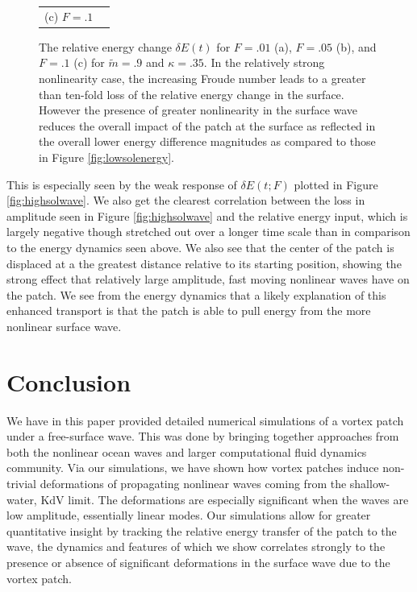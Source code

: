 \documentclass[a4paper,11pt]{article}
\begin{document}
\begin{figure}
\begin{tabular}{cc}
 (c) $F=.1$
\end{tabular}
\caption{The relative energy change $\delta E(t)$ for $F=.01$ (a), $F=.05$ (b), and $F=.1$ (c) for $\tilde{m}=.9$ and $\kappa = .35$.  In the relatively strong nonlinearity case, the increasing Froude number leads to a greater than ten-fold loss of the relative energy change in the surface.  However the  presence of greater nonlinearity in the surface wave reduces the overall impact of the patch at the surface as reflected in the overall lower energy difference magnitudes as compared to those in Figure \ref{fig:lowsolenergy}.}
\label{fig:highsolenergy}
\end{figure}

This is especially seen by the weak response of $\delta E(t;F)$ plotted in Figure \ref{fig:highsolwave}.  We also get the clearest correlation between the loss in amplitude seen in Figure \ref{fig:highsolwave} and the relative energy input, which is largely negative though stretched out over a longer time scale than in comparison to the energy dynamics seen above.   We also see that the center of the patch is displaced at a the greatest distance relative to its starting position, showing the strong effect that relatively large amplitude, fast moving nonlinear waves have on the patch.  We see from the energy dynamics that a likely explanation of this enhanced transport is that the patch is able to pull energy from the more nonlinear surface wave.  
\section{Conclusion}
We have in this paper provided detailed numerical simulations of a vortex patch under a free-surface wave.  This was done by bringing together approaches from both the nonlinear ocean waves and larger computational fluid dynamics community.  Via our simulations, we have shown how vortex patches induce non-trivial deformations of propagating nonlinear waves coming from the shallow-water, KdV limit.  The deformations are especially significant when the waves are low amplitude, essentially linear modes.  Our simulations allow for greater quantitative insight by tracking the relative energy transfer of the patch to the wave, the dynamics and features of which we show correlates strongly to the presence or absence of significant deformations in the surface wave due to the vortex patch.  
\end{document}
